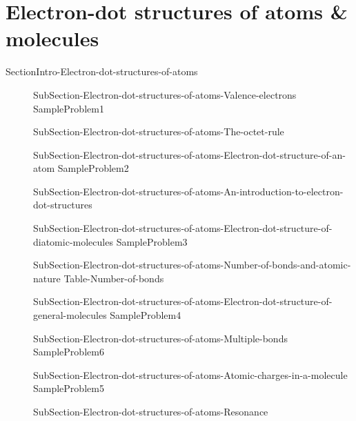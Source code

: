\documentclass[main.tex]{subfiles}
\begin{document}
\section{Electron-dot structures of atoms \& molecules}{SectionIntro-Electron-dot-structures-of-atoms}
\sloppy\begin{description}
\item[] {SubSection-Electron-dot-structures-of-atoms-Valence-electrons}
{SampleProblem1}
\item[] {SubSection-Electron-dot-structures-of-atoms-The-octet-rule}
\item[] {SubSection-Electron-dot-structures-of-atoms-Electron-dot-structure-of-an-atom}
{SampleProblem2}
\item[] {SubSection-Electron-dot-structures-of-atoms-An-introduction-to-electron-dot-structures}
\item[] {SubSection-Electron-dot-structures-of-atoms-Electron-dot-structure-of-diatomic-molecules}
{SampleProblem3}
\item[] {SubSection-Electron-dot-structures-of-atoms-Number-of-bonds-and-atomic-nature}
{Table-Number-of-bonds}
\item[] {SubSection-Electron-dot-structures-of-atoms-Electron-dot-structure-of-general-molecules}
{SampleProblem4}
\item[] {SubSection-Electron-dot-structures-of-atoms-Multiple-bonds}
{SampleProblem6}
\item[] {SubSection-Electron-dot-structures-of-atoms-Atomic-charges-in-a-molecule}
{SampleProblem5}
\item[] {SubSection-Electron-dot-structures-of-atoms-Resonance}

\end{description}
\end{document}
